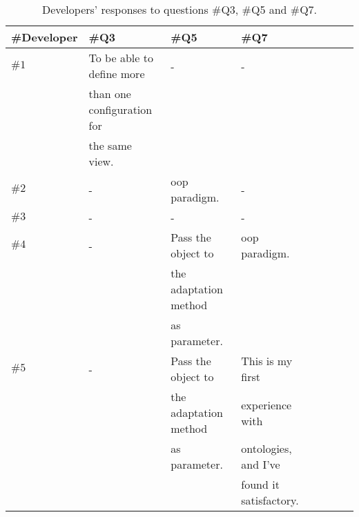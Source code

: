 \begin{table}
  \caption{Developers' responses to questions \#Q3, \#Q5 and \#Q7.}
 \label{tbl:developers_responses_2}
\footnotesize
\centering
 \begin{tabular}{l l l l l l l l}
  \hline 
  \textbf{\#Developer} 	& \textbf{\#Q3} 		& \textbf{\#Q5} 	& \textbf{\#Q7}	\\
  \hline
  $\#1$			& To be able to define more	& -			& -		\\
			& than one configuration for 	& 			& 		\\
			& the same view.		& 			& 		\\
  $\#2$			& -				& \acs{oop} paradigm.	& -		\\
  $\#3$			& -				& -			& -		\\
  $\#4$			& - 				& Pass the object to	& \acs{oop} paradigm.	\\
			&				& the adaptation method & 		\\
			&				& as parameter.		& 		\\
  $\#5$			& -				& Pass the object to	& This is my first \\
			& 				& the adaptation method	& experience with  \\
			& 				& as parameter.		& ontologies, and I've \\
			&				&			& found it satisfactory. \\
  \hline
\end{tabular}
\end{table}


